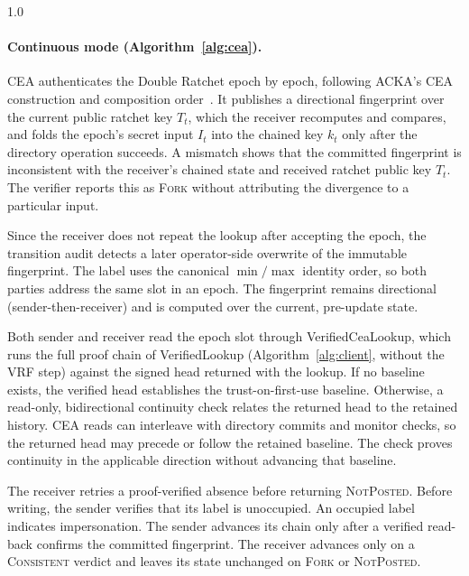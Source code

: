 \begin{spacing}{1.0}
\clearpage
\paragraph{Continuous mode (Algorithm~\ref{alg:cea}).} CEA authenticates the Double Ratchet epoch by
epoch, following ACKA's CEA construction and composition order~\cite[Figures~8 and~10]{dowling2023acka}.
It publishes a directional fingerprint over the current public ratchet key $T_t$, which the receiver
recomputes and compares, and folds the epoch's secret input $I_t$ into the chained key $k_t$ only after
the directory operation succeeds. A mismatch shows that the committed fingerprint is inconsistent with
the receiver's chained state and received ratchet public key $T_t$. The verifier reports this as
\textsc{Fork} without attributing the divergence to a particular input.

Since the receiver does not repeat the lookup after accepting the epoch, the transition audit detects
a later operator-side overwrite of the immutable fingerprint. The label uses the canonical $\min/\max$ identity order, so both
parties address the same slot in an epoch. The fingerprint remains directional (sender-then-receiver)
and is computed over the current, pre-update state.

Both sender and receiver read the epoch slot through \textsf{VerifiedCeaLookup}, which runs the full
proof chain of \textsf{VerifiedLookup} (Algorithm~\ref{alg:client}, without the VRF step) against the
signed head returned with the lookup. If no baseline exists, the verified head establishes the
trust-on-first-use baseline. Otherwise, a read-only, bidirectional continuity check relates the
returned head to the retained history. CEA reads can interleave with directory commits and monitor
checks, so the returned head may precede or follow the retained baseline. The check proves continuity
in the applicable direction without advancing that baseline.

The receiver retries a proof-verified absence before returning \textsc{NotPosted}. Before writing, the
sender verifies that its label is unoccupied. An occupied label indicates impersonation. The sender
advances its chain only after a verified read-back confirms the committed fingerprint. The receiver
advances only on a \textsc{Consistent} verdict and leaves its state unchanged on \textsc{Fork} or
\textsc{NotPosted}.


\end{spacing}
